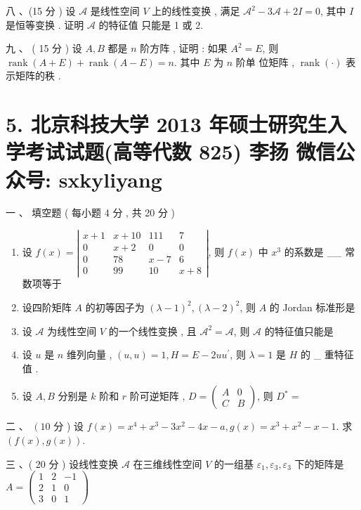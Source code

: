 \documentclass[10pt]{article}
\begin{document}
{ 八 、(15  分 )  设  $\mathscr{A}$  是线性空间  $V$  上的线性变换 ,  满足  $\mathscr{A}^{2}-3 \mathscr{A}+2 I=0$,  其中  $I$  是恒等变换 .  证明  $\mathscr{A}$  的特征值   只能是  1  或  $2 .$

 九 、 ( 15  分 )  设  $A, B$  都是  $n$  阶方阵 ,  证明 :  如果  $A^{2}=E$,  则  $\operatorname{rank}(A+E)+\operatorname{rank}(A-E)=n$.  其中  $E$  为  $n$  阶单   位矩阵 , $\operatorname{rank}(\cdot)$  表示矩阵的秩 .

\section{5. 北京科技大学 2013 年硕士研究生入学考试试题(高等代数 825) 
 李扬 
 微信公众号: sxkyliyang}
 一 、 填空题 ( 每小题  4  分 ,  共  20  分 )

\begin{enumerate}
  \item  设  $f(x)=\left|\begin{array}{cccc}x+1 & x+10 & 111 & 7 \\ 0 & x+2 & 0 & 0 \\ 0 & 78 & x-7 & 6 \\ 0 & 99 & 10 & x+8\end{array}\right|$,  则  $f(x)$  中  $x^{3}$  的系数是 \_\_ 常数项等于 

  \item  设四阶矩阵  $A$  的初等因子为  $(\lambda-1)^{2},(\lambda-2)^{2}$,  则  $A$  的  Jordan  标准形是 

  \item  设  $\mathscr{A}$  为线性空间  $V$  的一个线性变换 ,  且  $\mathscr{A}^{2}=\mathscr{A}$,  则  $\mathscr{A}$  的特征值只能是 

  \item  设  $u$  是  $n$  维列向量 , $(u, u)=1, H=E-2 u u^{\prime}$,  则  $\lambda=1$  是  $H$  的 \_ 重特征值 .

  \item  设  $A, B$  分别是  $k$  阶和  $r$  阶可逆矩阵 , $D=\left(\begin{array}{cc}A & 0 \\ C & B\end{array}\right)$,  则  $D^{*}=$

\end{enumerate}
 二 、 $\left(10\right.$  分 )  设  $f(x)=x^{4}+x^{3}-3 x^{2}-4 x-a, g(x)=x^{3}+x^{2}-x-1$.  求  $(f(x), g(x))$.

 三 、( 20  分 )  设线性变换  $\mathscr{A}$  在三维线性空间  $V$  的一组基  $\varepsilon_{1}, \varepsilon_{3}, \varepsilon_{3}$  下的矩阵是  $A=\left(\begin{array}{cccc}1 & 2 & -1 \\ 2 & 1 & 0 \\ 3 & 0 & 1\end{array}\right)$

}
\end{document}
